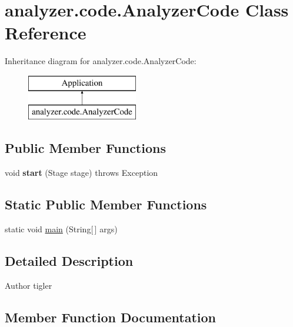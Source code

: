 \hypertarget{classanalyzer_1_1code_1_1AnalyzerCode}{}\section{analyzer.\+code.\+Analyzer\+Code Class Reference}
\label{classanalyzer_1_1code_1_1AnalyzerCode}
Inheritance diagram for analyzer.\+code.\+Analyzer\+Code\+:\begin{figure}[H]
\begin{center}
\leavevmode
\includegraphics[height=2.000000cm]{classanalyzer_1_1code_1_1AnalyzerCode}
\end{center}
\end{figure}
\subsection*{Public Member Functions}
\begin{DoxyCompactItemize}
\item 
\mbox{\label{classanalyzer_1_1code_1_1AnalyzerCode_ae7e73920c0e5911b5491f83325160fd7}} 
void {\bfseries start} (Stage stage)  throws Exception 
\end{DoxyCompactItemize}
\subsection*{Static Public Member Functions}
\begin{DoxyCompactItemize}
\item 
static void \hyperlink{classanalyzer_1_1code_1_1AnalyzerCode_a60142285e91707f115ad27dccdf740eb}{main} (String\mbox{[}$\,$\mbox{]} args)
\end{DoxyCompactItemize}


\subsection{Detailed Description}
\begin{DoxyAuthor}{Author}
tigler 
\end{DoxyAuthor}


\subsection{Member Function Documentation}
\mbox{\label{classanalyzer_1_1code_1_1AnalyzerCode_a60142285e91707f115ad27dccdf740eb}} 
